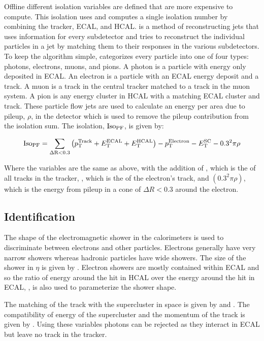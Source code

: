 Offline different isolation variables are defined that are more expensive to
compute. This isolation uses \particleflow\cite{particle_flow_2010} and
computes a single isolation number by combining the tracker, ECAL, and HCAL.
\ParticleFlow is a method of reconstructing jets that uses information for
every subdetector and tries to reconstruct the individual particles in a jet by
matching them to their responses in the various subdetectors. To keep the
algorithm simple, \particleflow categorizes every particle into one of four
types: photons, electrons, muons, and pions. A photon is a particle with energy
only deposited in ECAL. An electron is a particle with an ECAL energy deposit
and a track. A muon is a track in the central tracker matched to a track in the
muon system. A pion is any energy cluster in HCAL with a matching ECAL cluster
and track. These particle flow jets are used to calculate an energy per area
due to pileup, $\rho$, in the detector which is used to remove the pileup
contribution from the isolation sum. The \particleflow isolation, $\text{Iso}_{\text{PF}}$, is
given by:

\begin{equation}
    \text{Iso}_{\text{PF}} = \sum_{\Delta \text{R}<0.3} \left(p_{\mathrm{T}}^{\text{Track}} + E_{\mathrm{T}}^{\text{ECAL}} + E_{\mathrm{T}}^{\text{HCAL}}\right) - p_{\mathrm{T}}^{\text{Electron}}
    - E_{\mathrm{T}}^{\text{SC}} - 0.3^{2} \pi \rho
\end{equation}

Where the variables are the same as above, with the addition of \ptTrack, which
is the \pt of all tracks in the tracker, \ptElectron, which is the \pt of the
electron's track, and $\left(0.3^{2} \pi \rho\right)$, which is the energy from
pileup in a cone of $\Delta R < 0.3$ around the electron.

\subsection{Identification}

The shape of the electromagnetic shower in the calorimeters is used to
discriminate between electrons and other particles. Electrons generally have
very narrow showers whereas hadronic particles have wide showers. The size of
the shower in $\eta$ is given by \sigmaietaieta. Electron showers are mostly
contained within ECAL and so the ratio of energy around the hit in HCAL over
the energy around the hit in ECAL, \HOverE, is also used to parameterize the
shower shape.

The matching of the track with the supercluster in \coordetaphi space is given
by \dphiin and \detain.  The compatibility of energy of the supercluster and
the momentum of the track is given by \ooeoop. Using these variables photons
can be rejected as they interact in ECAL but leave no track in the tracker.

